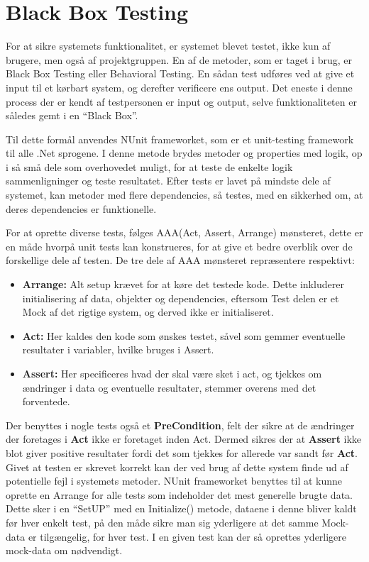 \section{Black Box Testing}\label{BBtest}
For at sikre systemets funktionalitet, er systemet blevet testet, ikke kun af brugere, men også af projektgruppen.
En af de metoder, som er taget i brug, er Black Box Testing eller Behavioral Testing.
En sådan test udføres ved at give et input til et kørbart system, og derefter verificere ens output.
Det eneste i denne process der er kendt af testpersonen er input og output, selve funktionaliteten er således gemt i en ``Black Box''. \citep{Black_Box}

Til dette formål anvendes NUnit frameworket, som er et unit-testing framework til alle .Net sprogene.
I denne metode brydes metoder og properties med logik, op i så små dele som overhovedet muligt, for at teste de enkelte logik sammenligninger og teste resultatet.
Efter tests er lavet på mindste dele af systemet, kan metoder med flere dependencies, så testes, med en sikkerhed om, at deres dependencies er funktionelle.
\citep{Unit_Testing}

For at oprette diverse tests, følges AAA(Act, Assert, Arrange) mønsteret, dette er en måde hvorpå unit tests kan konstrueres, for at give et bedre overblik over de forskellige dele af testen.
\citep{Writing_Your_Tests}
De tre dele af AAA mønsteret repræsentere respektivt:
\begin{itemize}
  \item \textbf{Arrange:} Alt setup krævet for at køre det testede kode. Dette inkluderer initialisering af data, objekter og dependencies, eftersom Test delen er et Mock af det rigtige system, og derved ikke er initialiseret.
  \item \textbf{Act:} Her kaldes den kode som ønskes testet, såvel som gemmer eventuelle resultater i variabler, hvilke bruges i Assert.
  \item \textbf{Assert:} Her specificeres hvad der skal være sket i act, og tjekkes om ændringer i data og eventuelle resultater, stemmer overens med det forventede.
\end{itemize}
Der benyttes i nogle tests også et \textbf{PreCondition}, felt der sikre at de ændringer der foretages i \textbf{Act} ikke er foretaget inden Act. 
Dermed sikres der at \textbf{Assert} ikke blot giver positive resultater fordi det som tjekkes for allerede var sandt før \textbf{Act}.
Givet at testen er skrevet korrekt kan der ved brug af dette system finde ud af potentielle fejl i systemets metoder.
NUnit frameworket benyttes til at kunne oprette en Arrange for alle tests som indeholder det mest generelle brugte data.
Dette sker i en ``SetUP'' med en Initialize() metode, dataene i denne bliver kaldt før hver enkelt test, på den måde sikre man sig yderligere at det samme Mock-data er tilgængelig, for hver test.
I en given test kan der så oprettes yderligere mock-data om nødvendigt.

